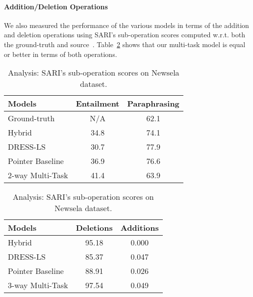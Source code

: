 \documentclass[11pt]{article}
\begin{document}
\paragraph{Addition/Deletion Operations}
We also measured the performance of the various models in terms of the addition and deletion operations using SARI's sub-operation scores computed w.r.t. both the ground-truth and source~\cite{Xu2016OptimizingSM}. Table~\ref{table:individual_scores_results} shows that our multi-task model is equal or better in terms of both operations. 

\begin{table}[t]
\begin{minipage}[t]{.55\linewidth}
\begin{small}
\begin{center}
\begin{tabular}{|l|c|c|}
\hline
Models & Entailment & Paraphrasing \\
\hline
Ground-truth & N/A & 62.1 \\
\hdashline
Hybrid &  34.8 & 74.1 \\
DRESS-LS &  30.7 & 77.9 \\
Pointer Baseline &  36.9 &  76.6 \\
2-way Multi-Task & 41.4 & 63.9 \\
\hline
\end{tabular}
\end{center}
\vspace{-10pt}
\caption{Analysis: Entailment and paraphrase classification results (avg. probability scores as \%) on Newsela.}
\label{table:entailment_paraphrase_analysis_results}
\end{small}
\end{minipage}
\hfill
\begin{minipage}[t]{.41\linewidth}
\begin{small}
\begin{center}
\begin{tabular}{|l|c|c|}
\hline
Models & Deletions & Additions \\
\hline
Hybrid &  95.18 & 0.000 \\
DRESS-LS &  85.37 & 0.047 \\
Pointer Baseline &  88.91 &  0.026 \\
3-way Multi-Task & 97.54 & 0.049 \\
\hline
\end{tabular}
\end{center}
\vspace{-10pt}
\caption{Analysis: SARI's sub-operation scores on Newsela dataset.}
\label{table:individual_scores_results}
\end{small}
\end{minipage}
\vspace{-7pt}
\end{table}
\end{document}
